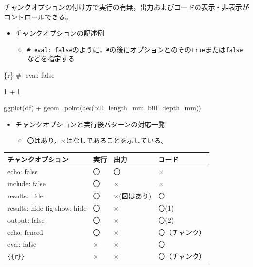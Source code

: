 \documentclass[
  b5paper,
  xelatex, ja=standard]{bxjsbook}
\newenvironment{Shaded}{\begin{snugshade}}{\end{snugshade}}
\newcommand{\InformationTok}[1]{\textcolor[rgb]{0.37,0.37,0.37}{#1}}
\providecommand{\tightlist}{%
  \setlength{\itemsep}{0pt}\setlength{\parskip}{0pt}}\usepackage{longtable,booktabs,array}
\begin{document}
チャンクオプションの付け方で実行の有無，出力およびコードの表示・非表示がコントロールできる。

\begin{itemize}
\tightlist
\item
  チャンクオプションの記述例

  \begin{itemize}
  \tightlist
  \item
    \texttt{\#\textbar{}\ eval:\ false}のように，\texttt{\#\textbar{}}の後にオプションとのその\texttt{true}または\texttt{false}などを指定する
  \end{itemize}
\end{itemize}

\begin{Shaded}
\begin{Highlighting}[]
\InformationTok{\textasciigrave{}\textasciigrave{}\textasciigrave{}\{r\}}
\InformationTok{\#| eval: false}

\InformationTok{1 + 1}

\InformationTok{ggplot(df) +}
\InformationTok{  geom\_point(aes(bill\_length\_mm, bill\_depth\_mm))}
\InformationTok{\textasciigrave{}\textasciigrave{}\textasciigrave{}}
\end{Highlighting}
\end{Shaded}

\begin{itemize}
\tightlist
\item
  チャンクオプションと実行後パターンの対応一覧

  \begin{itemize}
  \tightlist
  \item
    〇はあり，×はなしであることを示している。
  \end{itemize}
\end{itemize}

\begin{longtable}[]{@{}llll@{}}
\toprule\noalign{}
チャンクオプション & 実行 & 出力 & コード \\
\midrule\noalign{}
\endhead
\bottomrule\noalign{}
\endlastfoot
echo: false & 〇 & 〇 & × \\
include: false & 〇 & × & × \\
results: hide & 〇 & ×(図はあり) & 〇 \\
results: hide fig-show: hide & 〇 & × & 〇(1) \\
output: false & 〇 & × & 〇(2) \\
echo: fenced & 〇 & × & 〇（チャンク） \\
eval: false & × & × & 〇 \\
\texttt{\{\{r\}\}} & × & × & 〇（チャンク） \\
\end{longtable}
\end{document}
